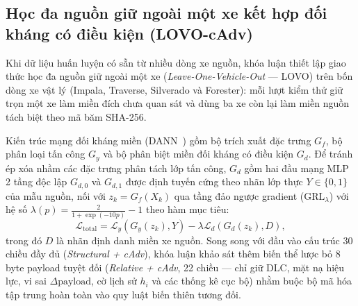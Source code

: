 \documentclass[12pt, a4paper, reqno, oneside]{book}
\begin{document}
\subsection{Học đa nguồn giữ ngoài một xe kết hợp đối kháng có điều kiện (LOVO-cAdv)}\label{subsec:method-lovo}
Khi dữ liệu huấn luyện có sẵn từ nhiều dòng xe nguồn, khóa luận thiết lập giao thức học đa nguồn giữ ngoài một xe (\textit{Leave-One-Vehicle-Out} --- LOVO) trên bốn dòng xe vật lý (Impala, Traverse, Silverado và Forester): mỗi lượt kiểm thử giữ trọn một xe làm miền đích chưa quan sát và dùng ba xe còn lại làm miền nguồn tách biệt theo mã băm SHA-256.

Kiến trúc mạng đối kháng miền (DANN~\cite{ganin2016dann}) gồm bộ trích xuất đặc trưng $G_f$, bộ phân loại tấn công $G_y$ và bộ phân biệt miền đối kháng có điều kiện $G_d$. Để tránh ép xóa nhầm các đặc trưng phân tách lớp tấn công, $G_d$ gồm hai đầu mạng MLP 2 tầng độc lập $G_{d,0}$ và $G_{d,1}$ được định tuyến cứng theo nhãn lớp thực $Y \in \{0, 1\}$ của mẫu nguồn, nối với $z_k = G_f(X_k)$ qua tầng đảo ngược gradient ($\text{GRL}_\lambda$) với hệ số $\lambda(p) = \frac{2}{1 + \exp(-10p)} - 1$ theo hàm mục tiêu:
\begin{equation}
\mathcal{L}_{\text{total}} = \mathcal{L}_y(G_y(z_k), Y) - \lambda \mathcal{L}_d(G_d(z_k), D),
\end{equation}
trong đó $D$ là nhãn định danh miền xe nguồn. Song song với đầu vào cấu trúc 30 chiều đầy đủ (\textit{Structural + cAdv}), khóa luận khảo sát thêm biến thể lược bỏ 8 byte payload tuyệt đối (\textit{Relative + cAdv}, 22 chiều --- chỉ giữ DLC, mặt nạ hiệu lực, vi sai $\Delta\text{payload}$, cờ lịch sử $h_i$ và các thống kê cục bộ) nhằm buộc bộ mã hóa tập trung hoàn toàn vào quy luật biến thiên tương đối.
\end{document}
